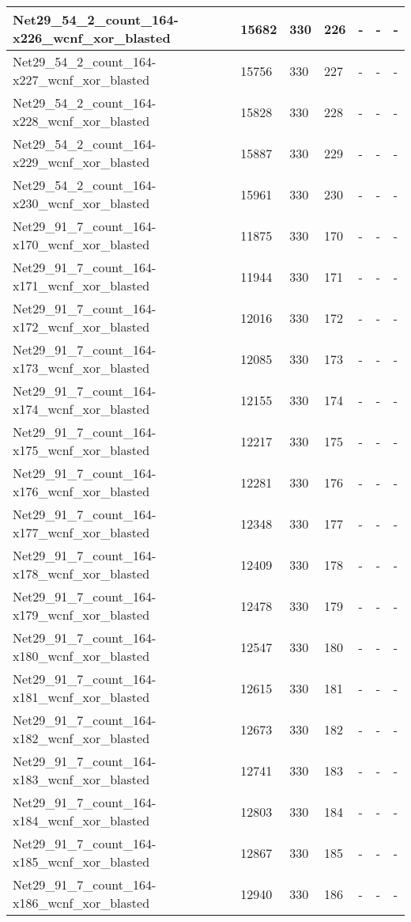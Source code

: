 \begin{scriptsize}
\begin{longtable}{|p{5cm}|l|l|l|l|l|l|}
Net29\_54\_2\_count\_164-x226\_wcnf\_xor\_blasted&15682&330&226&-&-&- \\ \hline 
Net29\_54\_2\_count\_164-x227\_wcnf\_xor\_blasted&15756&330&227&-&-&- \\ \hline 
Net29\_54\_2\_count\_164-x228\_wcnf\_xor\_blasted&15828&330&228&-&-&- \\ \hline 
Net29\_54\_2\_count\_164-x229\_wcnf\_xor\_blasted&15887&330&229&-&-&- \\ \hline 
Net29\_54\_2\_count\_164-x230\_wcnf\_xor\_blasted&15961&330&230&-&-&- \\ \hline 
Net29\_91\_7\_count\_164-x170\_wcnf\_xor\_blasted&11875&330&170&-&-&- \\ \hline 
Net29\_91\_7\_count\_164-x171\_wcnf\_xor\_blasted&11944&330&171&-&-&- \\ \hline 
Net29\_91\_7\_count\_164-x172\_wcnf\_xor\_blasted&12016&330&172&-&-&- \\ \hline 
Net29\_91\_7\_count\_164-x173\_wcnf\_xor\_blasted&12085&330&173&-&-&- \\ \hline 
Net29\_91\_7\_count\_164-x174\_wcnf\_xor\_blasted&12155&330&174&-&-&- \\ \hline 
Net29\_91\_7\_count\_164-x175\_wcnf\_xor\_blasted&12217&330&175&-&-&- \\ \hline 
Net29\_91\_7\_count\_164-x176\_wcnf\_xor\_blasted&12281&330&176&-&-&- \\ \hline 
Net29\_91\_7\_count\_164-x177\_wcnf\_xor\_blasted&12348&330&177&-&-&- \\ \hline 
Net29\_91\_7\_count\_164-x178\_wcnf\_xor\_blasted&12409&330&178&-&-&- \\ \hline 
Net29\_91\_7\_count\_164-x179\_wcnf\_xor\_blasted&12478&330&179&-&-&- \\ \hline 
Net29\_91\_7\_count\_164-x180\_wcnf\_xor\_blasted&12547&330&180&-&-&- \\ \hline 
Net29\_91\_7\_count\_164-x181\_wcnf\_xor\_blasted&12615&330&181&-&-&- \\ \hline 
Net29\_91\_7\_count\_164-x182\_wcnf\_xor\_blasted&12673&330&182&-&-&- \\ \hline 
Net29\_91\_7\_count\_164-x183\_wcnf\_xor\_blasted&12741&330&183&-&-&- \\ \hline 
Net29\_91\_7\_count\_164-x184\_wcnf\_xor\_blasted&12803&330&184&-&-&- \\ \hline 
Net29\_91\_7\_count\_164-x185\_wcnf\_xor\_blasted&12867&330&185&-&-&- \\ \hline 
Net29\_91\_7\_count\_164-x186\_wcnf\_xor\_blasted&12940&330&186&-&-&- \\ \hline 

\end{longtable}
\end{scriptsize}
